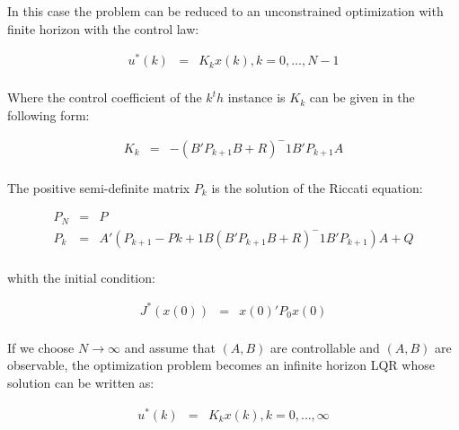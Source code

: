 		In this case the problem can be reduced to an unconstrained optimization with finite horizon with the control law: 
		
		\begin{equation}
        \begin{array}{rcl}
         u^*(k)&=&K_kx(k), k=0,\dots,N-1\\
        \end{array}
        \label{BASIC:equ:control_law}
    \end{equation}
		
		Where the control coefficient of the $k^th$ instance is $K_k$ can be given in the following form:
		
		\begin{equation}
        \begin{array}{rcl}
         K_k&=&-(B'P_{k+1}B+R)^-1B'P_{k+1}A\\
        \end{array}
        \label{BASIC:equ:control_coefficient}
    \end{equation}
		
		The positive semi-definite matrix $P_k$ is the solution of the Riccati equation:
		
		\begin{equation}
        \begin{array}{rcl}
        P_N&=&P\\
				P_k&=&A'(P_{k+1}-P{k+1}B(B'P_{k+1}B+R)^-1B'P_{k+1})A+Q\\
        \end{array}
        \label{BASIC:equ:Riccati}
    \end{equation}
		
		whith the initial condition:
		
		\begin{equation}
        \begin{array}{rcl}
				J^*(x(0))&=&x(0)'P_0x(0)\\
        \end{array}
        \label{BASIC:equ:Riccati_initial}
    \end{equation}
		
		If we choose $N\longrightarrow\infty$ and assume that $(A,B)$ are controllable and $(A,B)$ are observable, the optimization problem becomes an infinite horizon LQR whose solution can be written as:
		
		\begin{equation}
        \begin{array}{rcl}
         u^*(k)&=&K_kx(k), k=0,\dots,\infty\\
        \end{array}
        \label{BASIC:equ:control_law_infinite}
    \end{equation}
		
